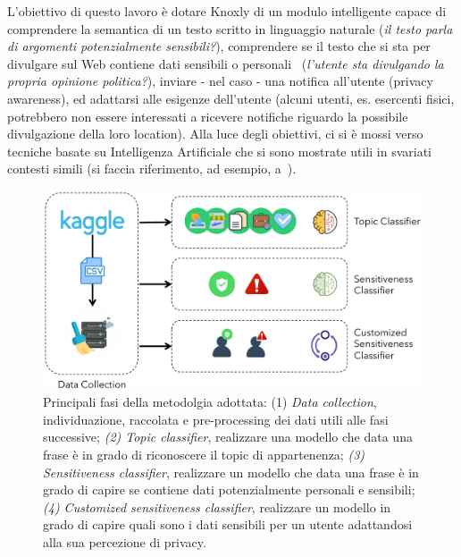 \label{ch:method}
L'obiettivo di questo lavoro è dotare Knoxly di un modulo intelligente capace di comprendere la semantica di un testo scritto in linguaggio naturale (\textit{il testo parla di argomenti potenzialmente sensibili?}), comprendere se il testo che si sta per divulgare sul Web contiene dati sensibili o personali~\cite{dataSpectrum} (\textit{l'utente sta divulgando la propria opinione politica?}), inviare - nel caso - una notifica all'utente (privacy awareness), ed adattarsi alle esigenze dell'utente (alcuni utenti, es. esercenti fisici, potrebbero non essere interessati a ricevere notifiche riguardo la possibile divulgazione della loro location). Alla luce degli obiettivi, ci si è mossi verso tecniche basate su Intelligenza Artificiale che si sono mostrate utili in svariati contesti simili (si faccia riferimento, ad esempio, a~\cite{dontTweetThis, hybrid}).

\begin{figure}[h!t]
    \centering
    \includegraphics[width=15cm]{Figure/grafici/wholemethodology_cropped.pdf}
    \caption{Principali fasi della metodolgia adottata: (1) \textit{Data collection}, individuazione, raccolata e pre-processing dei dati utili alle fasi successive; \textit{(2) Topic classifier}, realizzare una modello che data una frase è in grado di riconoscere il topic di appartenenza; \textit{(3) Sensitiveness classifier}, realizzare un modello che data una frase è in grado di capire se contiene dati potenzialmente personali e sensibili; \textit{(4) Customized sensitiveness classifier}, realizzare un modello in grado di capire quali sono i dati sensibili per un utente adattandosi alla sua percezione di privacy.}
    \label{fig:wholemethod}
\end{figure}

